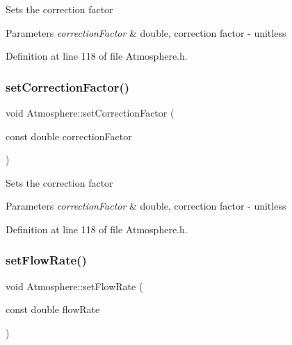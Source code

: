 Sets the correction factor 
\begin{DoxyParams}{Parameters}
{\em correction\+Factor} & double, correction factor -\/ unitless \\
\hline
\end{DoxyParams}


Definition at line 118 of file Atmosphere.\+h.

\mbox{\label{class_atmosphere_a86fab4b05de35c9a2b1a3a7e5ab70779}} 
\subsubsection{\texorpdfstring{set\+Correction\+Factor()}{setCorrectionFactor()}\hspace{0.1cm}{\footnotesize\ttfamily [3/3]}}
{\footnotesize\ttfamily void Atmosphere\+::set\+Correction\+Factor (\begin{DoxyParamCaption}\item[{const double}]{correction\+Factor }\end{DoxyParamCaption})\hspace{0.3cm}{\ttfamily [inline]}}

Sets the correction factor 
\begin{DoxyParams}{Parameters}
{\em correction\+Factor} & double, correction factor -\/ unitless \\
\hline
\end{DoxyParams}


Definition at line 118 of file Atmosphere.\+h.

\mbox{\label{class_atmosphere_a9ff0b718c810aec0bb101336db69fd22}} 
\subsubsection{\texorpdfstring{set\+Flow\+Rate()}{setFlowRate()}\hspace{0.1cm}{\footnotesize\ttfamily [1/3]}}
{\footnotesize\ttfamily void Atmosphere\+::set\+Flow\+Rate (\begin{DoxyParamCaption}\item[{const double}]{flow\+Rate }\end{DoxyParamCaption})\hspace{0.3cm}{\ttfamily [inline]}}

